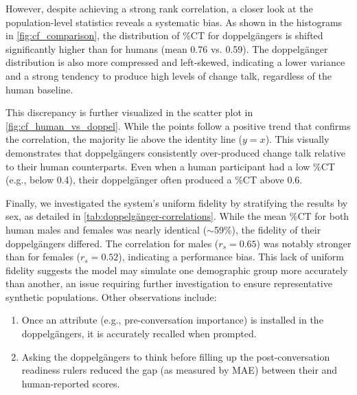 However, despite achieving a strong rank correlation, a closer look at the population-level statistics reveals a systematic bias. As shown in the histograms in \cref{fig:cf_comparison}, the distribution of \%CT for doppelgängers is shifted significantly higher than for humans (mean 0.76 vs. 0.59). The doppelgänger distribution is also more compressed and left-skewed, indicating a lower variance and a strong tendency to produce high levels of change talk, regardless of the human baseline.

This discrepancy is further visualized in the scatter plot in \cref{fig:cf_human_vs_doppel}. While the points follow a positive trend that confirms the correlation, the majority lie above the identity line ($y=x$). This visually demonstrates that doppelgängers consistently over-produced change talk relative to their human counterparts. Even when a human participant had a low \%CT (e.g., below 0.4), their doppelgänger often produced a \%CT above 0.6.

Finally, we investigated the system's uniform fidelity by stratifying the results by sex, as detailed in \cref{tab:doppelgänger-correlations}. While the mean \%CT for both human males and females was nearly identical ($\sim$59\%), the fidelity of their doppelgängers differed. The correlation for males ($r_s = 0.65$) was notably stronger than for females ($r_s = 0.52$), indicating a performance bias. This lack of uniform fidelity suggests the model may simulate one demographic group more accurately than another, an issue requiring further investigation to ensure representative synthetic populations. Other observations include:

\begin{enumerate}
    \item Once an attribute (e.g., pre-conversation importance) is installed in the doppelgängers, it is accurately recalled when prompted.
    \item Asking the doppelgängers to think before filling up the post-conversation readiness rulers reduced the gap (as measured by MAE) between their and human-reported scores.
\end{enumerate}



